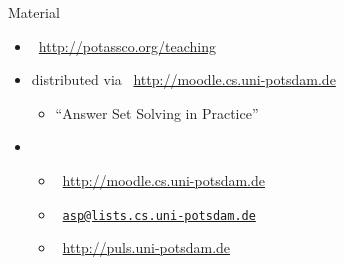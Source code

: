 \begin{frame}{Material}
  \bigskip
  \begin{itemize}\itemsep 0pt
  \item {} \ \url{http://potassco.org/teaching}
    \medskip
  \item {} distributed via \ \url{http://moodle.cs.uni-potsdam.de}
    \begin{itemize}
    \item {} ``Answer Set Solving in Practice''
    \end{itemize}
    \medskip
  \item {}
    \begin{itemize}
    \item {}      \ \url{http://moodle.cs.uni-potsdam.de}
    \item {}          \ \href{mailto:asp@lists.cs.uni-potsdam.de}{\texttt{asp@lists.cs.uni-potsdam.de}}
    \item {} \ \url{http://puls.uni-potsdam.de}
    \end{itemize}
    \medskip
  \end{itemize}
\end{frame}
